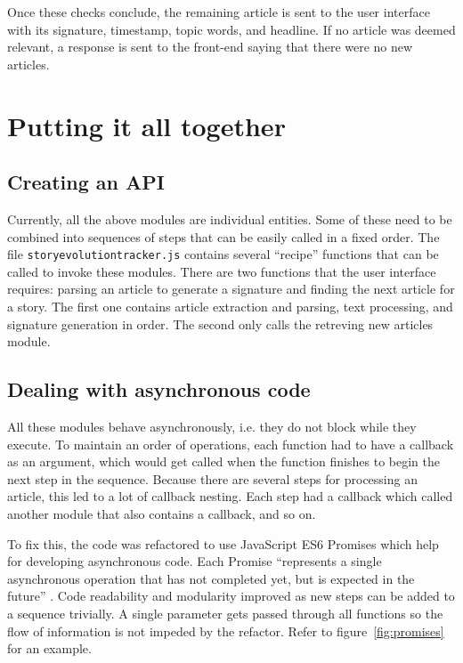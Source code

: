 \documentclass[11pt,titlepage]{report}
\begin{document}
Once these checks conclude, the remaining article is sent to the user interface with its signature, timestamp, topic words, and headline. If no article was deemed relevant, a response is sent to the front-end saying that there were no new articles.

\section{Putting it all together}
\subsection{Creating an API}
Currently, all the above modules are individual entities. Some of these need to be combined into sequences of steps that can be easily called in a fixed order. The file \lstinline|storyevolutiontracker.js| contains several ``recipe'' functions that can be called to invoke these modules. There are two functions that the user interface requires: parsing an article to generate a signature and finding the next article for a story. The first one contains article extraction and parsing, text processing, and signature generation in order. The second only calls the retreving new articles module.
\subsection{Dealing with asynchronous code}
All these modules behave asynchronously, i.e. they do not block while they execute. To maintain an order of operations, each function had to have a callback as an argument, which would get called when the function finishes to begin the next step in the sequence. Because there are several steps for processing an article, this led to a lot of callback nesting. Each step had a callback which called another module that also contains a callback, and so on.

To fix this, the code was refactored to use JavaScript ES6 Promises which help for developing asynchronous code. Each Promise ``represents a single asynchronous operation that has not completed yet, but is expected in the future'' \cite{promises}. Code readability and modularity improved as new steps can be added to a sequence trivially. A single parameter gets passed through all functions so the flow of information is not impeded by the refactor. Refer to figure~\ref{fig:promises} for an example.
\end{document}
